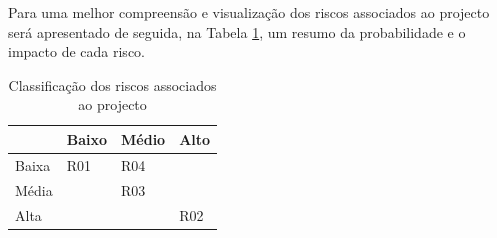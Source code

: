 Para uma melhor compreensão e visualização dos riscos associados ao projecto será apresentado de seguida, na Tabela \ref{tab:riscos}, um resumo da probabilidade e o impacto de cada risco.

\begin{table}[ht!]
	\centering
\begin{tabular}{ | l | l | l | l |}
	\hline
	\diagbox[width=15em]{Impacto}{Probabilidade}
	& Baixo & Médio & Alto\\
	\hline
	Baixa & \cellcolor{green}\centering R01 & \cellcolor{yellow}R04& \cellcolor{orange}\\
	\hline
	Média & \cellcolor{yellow} & \cellcolor{orange}R03 & \cellcolor{darkOrange}\\
	\hline
	Alta & \cellcolor{orange} & \cellcolor{darkOrange} & \cellcolor{red}R02\\
	\hline
\end{tabular}
\begin{center}
\caption {Classificação dos riscos associados ao projecto}
\label {tab:riscos}
\end{center}
\end{table}










\blankpage

\glsresetall
